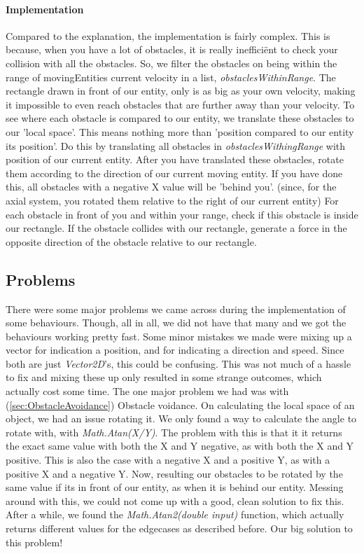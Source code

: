 \paragraph{Implementation}
Compared to the explanation, the implementation is fairly complex.
This is because, when you have a lot of obstacles, it is really ineffici\"ent to check your collision with all the obstacles.
So, we filter the obstacles on being within the range of movingEntities current velocity in a list, \textit{obstaclesWithinRange}.
The rectangle drawn in front of our entity, only is as big as your own velocity, making it impossible to even reach obstacles that are further away than your velocity.
To see where each obstacle is compared to our entity, we translate these obstacles to our 'local space'.
This means nothing more than 'position compared to our entity its position'.
Do this by translating all obstacles in \textit{obstaclesWithingRange} with position of our current entity.
After you have translated these obstacles, rotate them according to the direction of our current moving entity.
If you have done this, all obstacles with a negative X value will be 'behind you'. (since, for the axial system, you rotated them relative to the right of our current entity)
For each obstacle in front of you and within your range, check if this obstacle is inside our rectangle.
If the obstacle collides with our rectangle, generate a force in the opposite direction of the obstacle relative to our rectangle.

\subsection[Problems we had during implementing these behaviours]{Problems}\label{subsec:problems}
There were some major problems we came across during the implementation of some behaviours.
Though, all in all, we did not have that many and we got the behaviours working pretty fast.
Some minor mistakes we made were mixing up a vector for indication a position, and for indicating a direction and speed.
Since both are just \textit{Vector2D}'s, this could be confusing.
This was not much of a hassle to fix and mixing these up only resulted in some strange outcomes, which actually cost some time.
The one major problem we had was with (\ref{sec:ObstacleAvoidance}) Obstacle voidance.
On calculating the local space of an object, we had an issue rotating it.
We only found a way to calculate the angle to rotate with, with \textit{Math.Atan(X/Y)}.
The problem with this is that it it returns the exact same value with both the X and Y negative, as with both the X and Y positive.
This is also the case with a negative X and a positive Y, as with a positive X and a negative Y.
Now, resulting our obstacles to be rotated by the same value if its in front of our entity, as when it is behind our entity.
Messing around with this, we could not come up with a good, clean solution to fix this.
After a while, we found the \textit{Math.Atan2(double input)} function, which actually returns different values for the edgecases as described before.
Our big solution to this problem!
